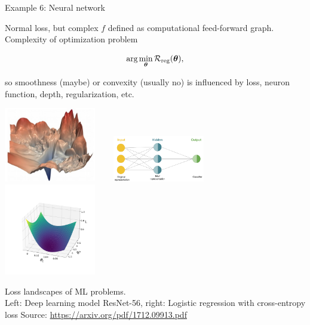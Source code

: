 \documentclass[11pt,compress,t,notes=noshow, xcolor=table]{beamer}
\begin{document}
\begin{vbframe}{Example 6: Neural network}

Normal loss, but complex $f$ defined as computational feed-forward graph. Complexity of optimization problem 

$$
\text{arg} \min_{\bm{\theta}} \mathcal{R}_{\text{reg}}(\bm{\theta}),
$$

so smoothness (maybe) or convexity (usually no) is influenced by loss, neuron function, depth, regularization, etc.

\vspace*{-0.4cm}
\begin{center}
		\includegraphics[width=0.3\textwidth]{figure_man/ml_landscape.jpg} ~~~ \includegraphics[width=0.3\textwidth]{figure_man/newrep_n_f.png} ~~~ \includegraphics[width=0.3\textwidth]{figure_man/log_reg.png} 
	\begin{footnotesize}
		\newline
		Loss landscapes of ML problems. \\ Left: Deep learning model ResNet-56, right: Logistic regression with cross-entropy loss
		\newline
		Source: \url{https://arxiv.org/pdf/1712.09913.pdf}
	\end{footnotesize}
\end{center}	

\end{vbframe}


\endlecture
\end{document}

